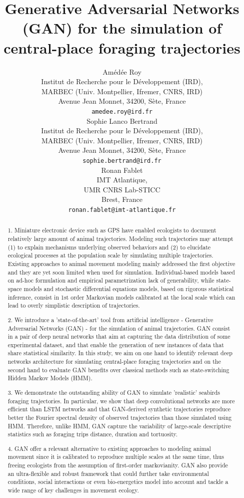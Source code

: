 \documentclass{article}
\title{Generative Adversarial Networks (GAN) for the simulation of central-place foraging trajectories}
\author{
  Amédée Roy \\
  Institut de Recherche pour le Développement (IRD),\\
  MARBEC (Univ. Montpellier, Ifremer, CNRS, IRD)\\
  Avenue Jean Monnet, 34200, Sète, France \\
  \texttt{amedee.roy@ird.fr} \\
   \And
  Sophie Lanco Bertrand \\
  Institut de Recherche pour le Développement (IRD),\\
  MARBEC (Univ. Montpellier, Ifremer, CNRS, IRD)\\
  Avenue Jean Monnet, 34200, Sète, France \\
  \texttt{sophie.bertrand@ird.fr} \\
  \And
  Ronan Fablet \\
  IMT Atlantique,\\
  UMR CNRS Lab-STICC\\
  Brest, France \\
  \texttt{ronan.fablet@imt-atlantique.fr} \\
}
\begin{document}
\maketitle
\doublespacing
\linenumbers

\begin{abstract}
1. Miniature electronic device such as GPS have enabled ecologists to document relatively large amount of animal trajectories. Modeling such trajectories may attempt (1) to explain mechanisms underlying observed behaviors and (2) to elucidate ecological processes at the population scale by simulating multiple trajectories. Existing approaches to animal movement modeling mainly addressed the first objective and they are yet soon limited when used for simulation. Individual-based models based on ad-hoc formulation and empirical parametrization lack of generability, while state-space models and stochastic differential equations models, based on rigorous statistical inference, consist in 1st order Markovian models calibrated at the local scale which can lead to overly simplistic description of trajectories.

2. We introduce a 'state-of-the-art' tool from artificial intelligence - Generative Adversarial Networks (GAN) - for the simulation of animal trajectories. GAN consist in a pair of deep neural networks that aim at capturing the data distribution of some experimental dataset, and that enable the generation of new instances of data that share statistical similarity. In this study, we aim on one hand to identify relevant deep networks architecture for simulating central-place foraging trajectories and on the second hand to evaluate GAN benefits over classical methods such as state-switching Hidden Markov Models (HMM).

3. We demonstrate the outstanding ability of GAN to simulate 'realistic' seabirds foraging trajectories. In particular, we show that deep convolutional networks are more efficient than LSTM networks and that GAN-derived synthetic trajectories reproduce better the Fourier spectral density of observed trajectories than those simulated using HMM. Therefore, unlike HMM, GAN capture the variability of large-scale descriptive statistics such as foraging trips distance, duration and tortuosity.

4. GAN offer a relevant alternative to existing approaches to modeling animal movement since it is calibrated to reproduce multiple scales at the same time, thus freeing ecologists from the assumption of first-order markovianity. GAN also provide an ultra-flexible and robust framework that could further take environmental conditions, social interactions or even bio-energetics model into account and tackle a wide range of key challenges in movement ecology.
\end{abstract}
\end{document}
